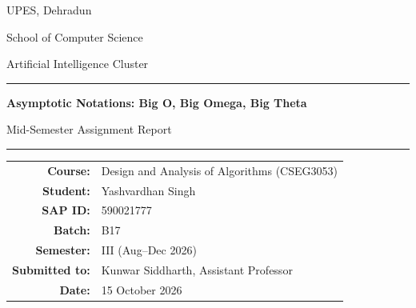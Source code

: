 \documentclass[11pt,a4paper]{article}
\newcommand{\studentname}{Yashvardhan Singh}
\newcommand{\sapid}{590021777}
\newcommand{\batch}{B17}
\newcommand{\topic}{Asymptotic Notations: Big O, Big Omega, Big Theta}
\newcommand{\submissiondate}{15 October 2026}
\begin{document}
\begin{titlepage}
\centering
{\Large UPES, Dehradun\par}
{\large School of Computer Science \par}
{\large Artificial Intelligence Cluster\par}
\vspace{2cm}
{\color{upesnavy}\rule{\linewidth}{1.2pt}\par}
\vspace{0.5cm}
{\Huge\bfseries \topic\par}
\vspace{0.5cm}
{\Large Mid-Semester Assignment Report\par}
\vspace{0.5cm}
{\color{upesnavy}\rule{\linewidth}{1.2pt}\par}
\vspace{2cm}
\begin{tabular}{rl}
\textbf{Course:} & Design and Analysis of Algorithms (CSEG3053)\\[0.3cm]
\textbf{Student:} & \studentname\\[0.3cm]
\textbf{SAP ID:} & \sapid\\[0.3cm]
\textbf{Batch:} & \batch\\[0.3cm]
\textbf{Semester:} & III (Aug--Dec 2026)\\[0.3cm]
\textbf{Submitted to:} & Kunwar Siddharth, Assistant Professor\\[0.3cm]
\textbf{Date:} & \submissiondate
\end{tabular}
\vfill
\end{titlepage}

\begin{abstract}
Asymptotic notation is a mathematical language used to describe how an algorithm's resource requirements grow as the input becomes large. This report explains three central notations: Big O, Big Omega, and Big Theta. Big O gives an asymptotic upper bound, Big Omega gives a lower bound, and Big Theta gives a tight bound when upper and lower bounds have the same order of growth. The report introduces the idea using simple examples, states formal definitions, and demonstrates the analysis of a loop-based algorithm. A Python animation plots constant, logarithmic, linear, linearithmic, and quadratic growth as the input size increases. The key lesson is that asymptotic analysis helps compare algorithm scalability independently of a particular computer, while constants and lower-order terms still matter for small inputs and practical performance.
\end{abstract}
\end{document}
